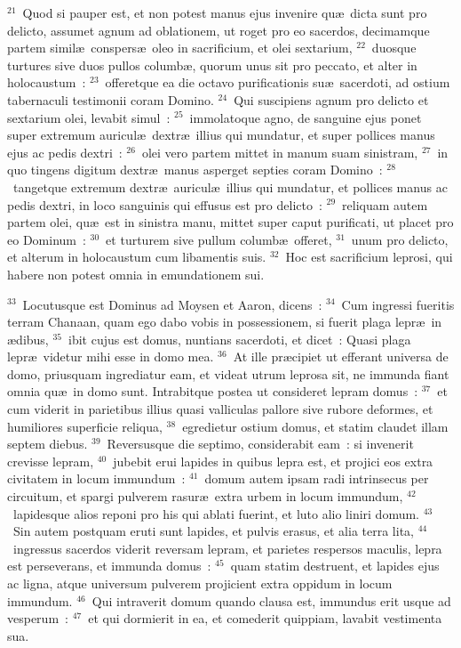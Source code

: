 ${}^{21}$~Quod si pauper est, et non potest manus ejus invenire qu\ae\ dicta sunt pro delicto, assumet agnum ad oblationem, ut roget pro eo sacerdos, decimamque partem simil\ae\ conspers\ae\ oleo in sacrificium, et olei sextarium,
${}^{22}$~duosque turtures sive duos pullos columb\ae , quorum unus sit pro peccato, et alter in holocaustum~:
${}^{23}$~offeretque ea die octavo purificationis su\ae\ sacerdoti, ad ostium tabernaculi testimonii coram Domino.
${}^{24}$~Qui suscipiens agnum pro delicto et sextarium olei, levabit simul~:
${}^{25}$~immolatoque agno, de sanguine ejus ponet super extremum auricul\ae\ dextr\ae\ illius qui mundatur, et super pollices manus ejus ac pedis dextri~:
${}^{26}$~olei vero partem mittet in manum suam sinistram,
${}^{27}$~in quo tingens digitum dextr\ae\ manus asperget septies coram Domino~:
${}^{28}$~tangetque extremum dextr\ae\ auricul\ae\ illius qui mundatur, et pollices manus ac pedis dextri, in loco sanguinis qui effusus est pro delicto~:
${}^{29}$~reliquam autem partem olei, qu\ae\ est in sinistra manu, mittet super caput purificati, ut placet pro eo Dominum~:
${}^{30}$~et turturem sive pullum columb\ae\ offeret,
${}^{31}$~unum pro delicto, et alterum in holocaustum cum libamentis suis.
${}^{32}$~Hoc est sacrificium leprosi, qui habere non potest omnia in emundationem sui.


${}^{33}$~Locutusque est Dominus ad Moysen et Aaron, dicens~:
${}^{34}$~Cum ingressi fueritis terram Chanaan, quam ego dabo vobis in possessionem, si fuerit plaga lepr\ae\ in \ae dibus,
${}^{35}$~ibit cujus est domus, nuntians sacerdoti, et dicet~: Quasi plaga lepr\ae\ videtur mihi esse in domo mea.
${}^{36}$~At ille pr\ae cipiet ut efferant universa de domo, priusquam ingrediatur eam, et videat utrum leprosa sit, ne immunda fiant omnia qu\ae\ in domo sunt. Intrabitque postea ut consideret lepram domus~:
${}^{37}$~et cum viderit in parietibus illius quasi valliculas pallore sive rubore deformes, et humiliores superficie reliqua,
${}^{38}$~egredietur ostium domus, et statim claudet illam septem diebus.
${}^{39}$~Reversusque die septimo, considerabit eam~: si invenerit crevisse lepram,
${}^{40}$~jubebit erui lapides in quibus lepra est, et projici eos extra civitatem in locum immundum~:
${}^{41}$~domum autem ipsam radi intrinsecus per circuitum, et spargi pulverem rasur\ae\ extra urbem in locum immundum,
${}^{42}$~lapidesque alios reponi pro his qui ablati fuerint, et luto alio liniri domum.
${}^{43}$~Sin autem postquam eruti sunt lapides, et pulvis erasus, et alia terra lita,
${}^{44}$~ingressus sacerdos viderit reversam lepram, et parietes respersos maculis, lepra est perseverans, et immunda domus~:
${}^{45}$~quam statim destruent, et lapides ejus ac ligna, atque universum pulverem projicient extra oppidum in locum immundum.
${}^{46}$~Qui intraverit domum quando clausa est, immundus erit usque ad vesperum~:
${}^{47}$~et qui dormierit in ea, et comederit quippiam, lavabit vestimenta sua.


